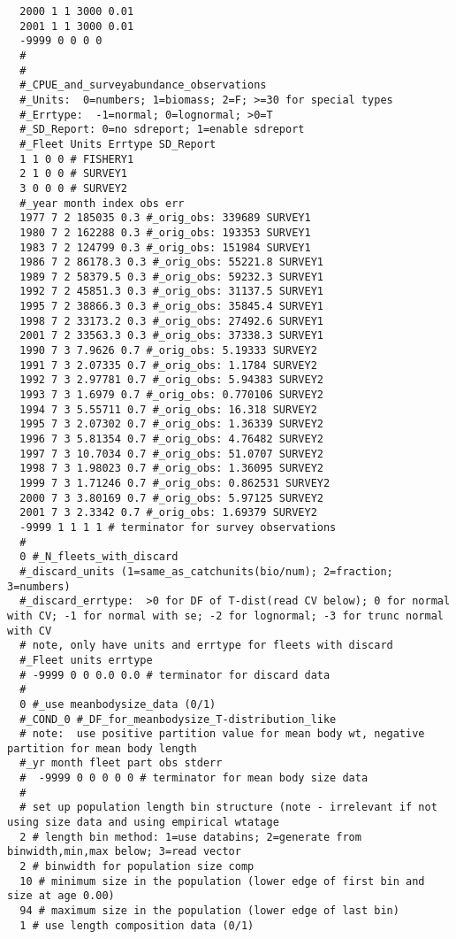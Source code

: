 \begin{landscape}
{\begin{verbatim}
  2000 1 1 3000 0.01
  2001 1 1 3000 0.01
  -9999 0 0 0 0
  #
  #
  #_CPUE_and_surveyabundance_observations
  #_Units:  0=numbers; 1=biomass; 2=F; >=30 for special types
  #_Errtype:  -1=normal; 0=lognormal; >0=T
  #_SD_Report: 0=no sdreport; 1=enable sdreport
  #_Fleet Units Errtype SD_Report
  1 1 0 0 # FISHERY1
  2 1 0 0 # SURVEY1
  3 0 0 0 # SURVEY2
  #_year month index obs err
  1977 7 2 185035 0.3 #_orig_obs: 339689 SURVEY1
  1980 7 2 162288 0.3 #_orig_obs: 193353 SURVEY1
  1983 7 2 124799 0.3 #_orig_obs: 151984 SURVEY1
  1986 7 2 86178.3 0.3 #_orig_obs: 55221.8 SURVEY1
  1989 7 2 58379.5 0.3 #_orig_obs: 59232.3 SURVEY1
  1992 7 2 45851.3 0.3 #_orig_obs: 31137.5 SURVEY1
  1995 7 2 38866.3 0.3 #_orig_obs: 35845.4 SURVEY1
  1998 7 2 33173.2 0.3 #_orig_obs: 27492.6 SURVEY1
  2001 7 2 33563.3 0.3 #_orig_obs: 37338.3 SURVEY1
  1990 7 3 7.9626 0.7 #_orig_obs: 5.19333 SURVEY2
  1991 7 3 2.07335 0.7 #_orig_obs: 1.1784 SURVEY2
  1992 7 3 2.97781 0.7 #_orig_obs: 5.94383 SURVEY2
  1993 7 3 1.6979 0.7 #_orig_obs: 0.770106 SURVEY2
  1994 7 3 5.55711 0.7 #_orig_obs: 16.318 SURVEY2
  1995 7 3 2.07302 0.7 #_orig_obs: 1.36339 SURVEY2
  1996 7 3 5.81354 0.7 #_orig_obs: 4.76482 SURVEY2
  1997 7 3 10.7034 0.7 #_orig_obs: 51.0707 SURVEY2
  1998 7 3 1.98023 0.7 #_orig_obs: 1.36095 SURVEY2
  1999 7 3 1.71246 0.7 #_orig_obs: 0.862531 SURVEY2
  2000 7 3 3.80169 0.7 #_orig_obs: 5.97125 SURVEY2
  2001 7 3 2.3342 0.7 #_orig_obs: 1.69379 SURVEY2
  -9999 1 1 1 1 # terminator for survey observations 
  #
  0 #_N_fleets_with_discard
  #_discard_units (1=same_as_catchunits(bio/num); 2=fraction; 3=numbers)
  #_discard_errtype:  >0 for DF of T-dist(read CV below); 0 for normal with CV; -1 for normal with se; -2 for lognormal; -3 for trunc normal with CV
  # note, only have units and errtype for fleets with discard 
  #_Fleet units errtype
  # -9999 0 0 0.0 0.0 # terminator for discard data 
  #
  0 #_use meanbodysize_data (0/1)
  #_COND_0 #_DF_for_meanbodysize_T-distribution_like
  # note:  use positive partition value for mean body wt, negative partition for mean body length 
  #_yr month fleet part obs stderr
  #  -9999 0 0 0 0 0 # terminator for mean body size data 
  #
  # set up population length bin structure (note - irrelevant if not using size data and using empirical wtatage
  2 # length bin method: 1=use databins; 2=generate from binwidth,min,max below; 3=read vector
  2 # binwidth for population size comp 
  10 # minimum size in the population (lower edge of first bin and size at age 0.00) 
  94 # maximum size in the population (lower edge of last bin) 
  1 # use length composition data (0/1)

\end{verbatim}}
\end{landscape}

